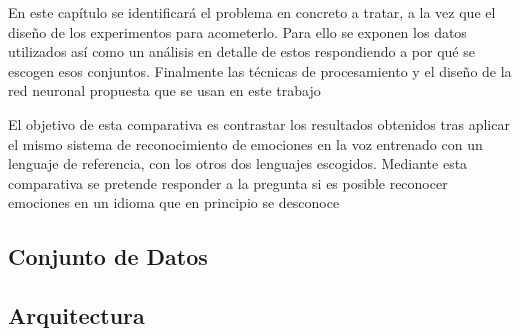 \documentclass[11pt,a4paper,spanish]{book}
\begin{document}
	
	\begin{comment}
		En este capítulo se debe indicar el trabajo previo realizado para identificar el problema
		concreto a tratar, así como las posibles soluciones alternativas que se van a evaluar.
		También se deben identificar los criterios de éxito para la comparativa, las medidas que
		se van a tomar, etc.
	\end{comment}
	En este capítulo se identificará el problema en concreto a tratar, a la vez que el diseño de los experimentos para acometerlo. Para ello se exponen los datos utilizados así como un análisis en detalle de estos respondiendo a por qué se escogen esos conjuntos. Finalmente las técnicas de procesamiento y el diseño de la red neuronal propuesta que se usan en este trabajo
	
	El objetivo de esta comparativa es contrastar los resultados obtenidos tras aplicar el mismo sistema de reconocimiento de emociones en la voz entrenado con un lenguaje de referencia, con los otros dos lenguajes escogidos. Mediante esta comparativa se pretende responder a la pregunta si es posible reconocer emociones en un idioma que en principio se desconoce
	
	\subsection{Conjunto de Datos}
	
	
	\subsection{Arquitectura}
	
		\printbibliography
	
\end{document}
